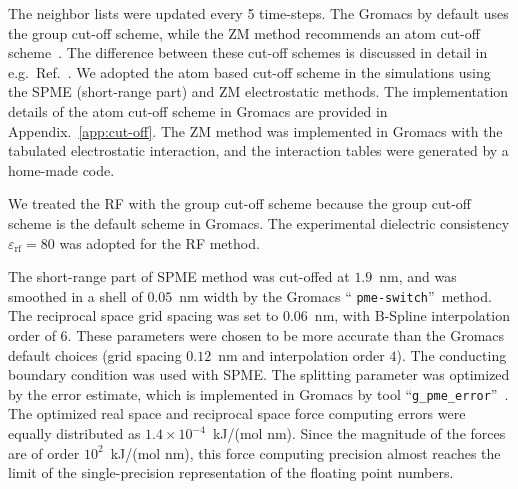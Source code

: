 \documentclass[a4paper,preprint,unsortedaddress,onecolumn,fleqn]{revtex4}
\newcommand{\recheck}[1]{{\color{red} #1}}
\begin{document}
The neighbor lists were updated every 5 time-steps. The Gromacs by default
uses the group cut-off scheme, while the ZM method recommends
an atom cut-off scheme~\cite{fukuda2011molecular,fukuda2013zero}. The difference between these cut-off
schemes is discussed in detail in e.g.~Ref.~\cite%
{hunenberger1998alternative,baumketner2009removing}. We adopted the atom
based cut-off scheme in the simulations using the SPME (short-range part)
and ZM electrostatic methods. The implementation details of the
atom cut-off scheme in Gromacs are provided in Appendix.~\ref{app:cut-off}.
The ZM method was implemented in Gromacs with the tabulated electrostatic
interaction, and the interaction tables were generated by a home-made code. 

We treated the RF with the group cut-off scheme because the
group cut-off scheme is the default scheme in Gromacs. The experimental
dielectric consistency $\varepsilon _{\text{rf}}=80$ was adopted for the RF
method.

The short-range part of SPME method was cut-offed at $1.9$~nm, and was
smoothed in a shell of $0.05$~nm width by the Gromacs \textquotedblleft 
\texttt{pme-switch}\textquotedblright\ method. The reciprocal space grid
spacing was set to $0.06$~nm, with B-Spline interpolation order of $6$.
These parameters were chosen to be more accurate than the Gromacs default
choices (grid spacing $0.12$~nm and interpolation order $4$). The conducting
boundary condition was used with SPME. The splitting parameter was optimized
by the error estimate, which is implemented in Gromacs by tool
\textquotedblleft \texttt{g\_pme\_error}\textquotedblright ~\cite%
{wang2010optimizing}. The optimized real space and reciprocal space force
computing errors were equally distributed as $1.4\times 10^{-4}$~kJ/(mol
nm). Since the magnitude of the forces are of order $10^{2}$~kJ/(mol nm),
this force computing precision almost reaches the limit of the
single-precision representation of the floating point numbers. 
\end{document}
